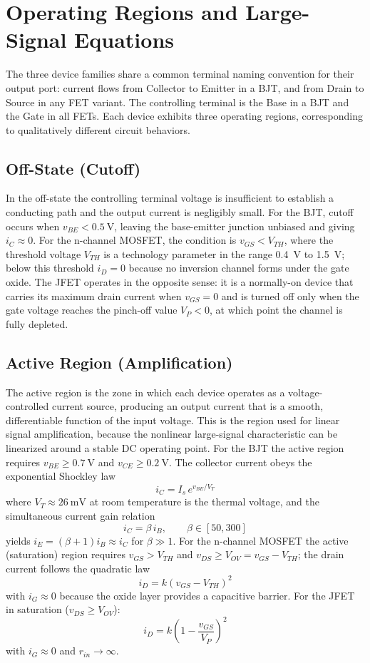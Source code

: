 \section{Operating Regions and Large-Signal Equations}
\label{sc:72}

The three device families share a common terminal naming convention for their output port: current flows from Collector to Emitter in a BJT, and from Drain to Source in any FET variant.
The controlling terminal is the Base in a BJT and the Gate in all FETs.
Each device exhibits three operating regions, corresponding to qualitatively different circuit behaviors.

\subsection{Off-State (Cutoff)}
\label{ssc:721}

In the off-state the controlling terminal voltage is insufficient to establish a conducting path and the output current is negligibly small.
For the BJT, cutoff occurs when \(v_{BE} < \SI{0.5}{\volt}\), leaving the base-emitter junction unbiased and giving \(i_C \approx 0\).
For the n-channel MOSFET, the condition is \(v_{GS} < V_{TH}\), where the threshold voltage \(V_{TH}\) is a technology parameter in the range \SI{0.4}{\volt} to \SI{1.5}{\volt}; below this threshold \(i_D = 0\) because no inversion channel forms under the gate oxide.
The JFET operates in the opposite sense: it is a normally-on device that carries its maximum drain current when \(v_{GS} = 0\) and is turned off only when the gate voltage reaches the pinch-off value \(V_P < 0\), at which point the channel is fully depleted.

\subsection{Active Region (Amplification)}
\label{ssc:722}

The active region is the zone in which each device operates as a voltage-controlled current source, producing an output current that is a smooth, differentiable function of the input voltage.
This is the region used for linear signal amplification, because the nonlinear large-signal characteristic can be linearized around a stable DC operating point.
For the BJT the active region requires \(v_{BE} \geq \SI{0.7}{\volt}\) and \(v_{CE} \geq \SI{0.2}{\volt}\).
The collector current obeys the exponential Shockley law
\[
i_C = I_s \, e^{v_{BE}/V_T}
\]
where \(V_T \approx \SI{26}{\milli\volt}\) at room temperature is the thermal voltage, and the simultaneous current gain relation
\[
i_C = \beta \, i_B, \qquad \beta \in [50, 300]
\]
yields \(i_E = (\beta + 1)i_B \approx i_C\) for \(\beta \gg 1\).
For the n-channel MOSFET the active (saturation) region requires \(v_{GS} > V_{TH}\) and \(v_{DS} \geq V_{OV} = v_{GS} - V_{TH}\); the drain current follows the quadratic law
\[
i_D = k(v_{GS} - V_{TH})^2
\]
with \(i_G \approx 0\) because the oxide layer provides a capacitive barrier.
For the JFET in saturation (\(v_{DS} \geq V_{OV}\)):
\[
i_D = k \left(1 - \frac{v_{GS}}{V_P}\right)^2
\]
with \(i_G \approx 0\) and \(r_{in} \to \infty\).

